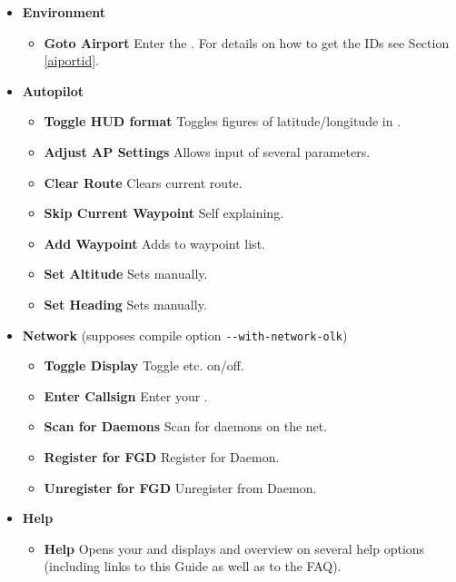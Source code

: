 \begin{itemize}
\item \textbf{Environment}
 \begin{itemize}
 \item \textbf{Goto Airport} Enter the . For details on how to get the IDs
  see Section \ref{aiportid}.
 \end{itemize}

 \item \textbf{Autopilot}
 \begin{itemize}
 \item \textbf{Toggle HUD format} Toggles figures of latitude/longitude in .
 \item \textbf{Adjust AP Settings} Allows input of several  parameters.
 \item \textbf{Clear Route} Clears current route.
 \item \textbf{Skip Current Waypoint} Self explaining.
 \item \textbf{Add Waypoint} Adds  to waypoint list.
 \item \textbf{Set Altitude} Sets  manually. 
 \item \textbf{Set Heading} Sets  manually.
 \end{itemize}
 
 \item\textbf{Network} (supposes compile option \texttt{-$ $-with-network-olk})
 \begin{itemize}
 \item \textbf{Toggle Display} Toggle  etc. on/off.
 \item \textbf{Enter Callsign} Enter your .
 \item \textbf{Scan for Daemons} Scan for daemons on the net.
 \item \textbf{Register for FGD} Register for \FlightGear{} Daemon.
 \item \textbf{Unregister for FGD} Unregister from \FlightGear{} Daemon.
 \end{itemize}

 \item \textbf{Help}
 \begin{itemize}
 \item \textbf{Help} Opens your  and displays and overview on several help options (including links to this Guide as well as to the FAQ).
 \end{itemize}
\end{itemize}

